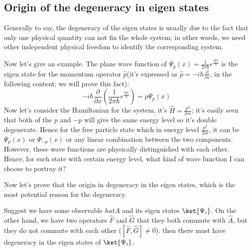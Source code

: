 \subsection{Origin of the degeneracy in eigen states}
\label{origin_degeneracy_in_operator}
%
%
%
Generally to say, the degeneracy of the eigen states is usually due
to the fact that only one physical quantity can not fix the whole
system; in other words, we need other independent physical freedom
to identify the corresponding system.

Now let's give an example. The plane wave function of $\Psi_{p}(x) =
\frac{1}{2\pi\hbar}e^{\frac{ipx}{\hbar}}$ is the eigen state for the
momentum operator $\hat{p}$(it's expressed as $\hat{p} = -i\hbar
\frac{\partial }{\partial x}$, in the following content; we will
prove this fact):
\begin{equation}\label{}
-i\hbar \frac{\partial }{\partial
x}\left(\frac{1}{2\pi\hbar}e^{\frac{ipx}{\hbar}}\right)
=p\Psi_{p}(x)
\end{equation}
Now let's consider the Hamiltonian for the system, it's $\hat{H} =
\frac{p^{2}}{2m}$; it's easily seen that both of the $p$ and $-p$
will give the same energy level so it's double degenerate. Hence for
the free particle state which in energy level $\frac{p^{2}}{2m}$, it
can be $\Psi_{p}(x)$ or $\Psi_{-p}(x)$ or any linear combination
between the two components. However, these wave functions are
physically distinguished with each other. Hence, for such state with
certain energy level, what kind of wave function I can choose to
portray it?

Now let's prove that the origin in degeneracy in the eigen states,
which is the most potential reason for the degeneracy.

\begin{theorem}
Suggest we have some observable $hat{A}$ and its eigen states
$\ket{\Psi_{i}}$. On the other hand, we have two operators $\hat{F}$
and $\hat{G}$ that they both commute with $\hat{A}$, but they do not
commute with each other ($[\hat{F}, \hat{G}] \neq 0$). then there
must have degeneracy in the eigen states of $\ket{\Psi_{i}}$.
\end{theorem}

